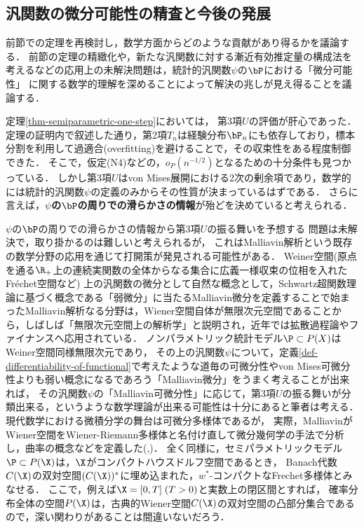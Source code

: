 \documentclass[uplatex, dvipdfmx]{jsarticle}
\begin{document}
\subsection{汎関数の微分可能性の精査と今後の発展}\label{subsection-Malliavin}

\begin{tcolorbox}[colframe=ForestGreen, colback=ForestGreen!10!white,breakable,colbacktitle=ForestGreen!40!white,coltitle=black,fonttitle=\bfseries\sffamily,
title=]
    前節での定理を再検討し，数学方面からどのような貢献があり得るかを議論する．
    前節の定理の精緻化や，新たな汎関数に対する漸近有効推定量の構成法を考えるなどの応用上の未解決問題は，統計的汎関数$\psi$の$\bP$における「微分可能性」
    に関する数学的理解を深めることによって解決の兆しが見え得ることを議論する．
\end{tcolorbox}

定理\ref{thm-semiparametric-one-step}においては，
第3項$U$の評価が肝心であった．
定理の証明内で叙述した通り，第2項$T_n$は経験分布$\bP_n$にも依存しており，標本分割を利用して過適合(overfitting)を避けることで，その収束性をある程度制御できた．
そこで，仮定(N4)などの，$o_P(n^{-1/2})$となるための十分条件も見つかっている\cite{Kennedy et al}．
しかし第3項$U$はvon Mises展開における2次の剰余項であり，数学的には統計的汎関数$\psi$の定義のみからその性質が決まっているはずである．
さらに言えば，\textbf{$\psi$の$\bP$の周りでの滑らかさの情報}が殆どを決めていると考えられる．

$\psi$の$\bP$の周りでの滑らかさの情報から第3項$U$の振る舞いを予想する
問題は未解決で，取り掛かるのは難しいと考えられるが，
これはMalliavin解析という既存の数学分野の応用を通じて打開策が発見される可能性がある．
Weiner空間(原点を通る$\R_+$上の連続実関数の全体からなる集合に広義一様収束の位相を入れたFréchet空間など)
上の汎関数の微分として自然な概念として，Schwartz超関数理論に基づく概念である「弱微分」に当たるMalliavin微分を定義することで始まったMalliavin解析なる分野は，Wiener空間自体が無限次元空間であることから，しばしば「無限次元空間上の解析学」と説明され，近年では拡散過程論やファイナンスへ応用されている\cite{Shinzo Watanabe}．
ノンパラメトリック統計モデル$\P\subset P(X)$はWeiner空間同様無限次元であり，
その上の汎関数$\psi$について，定義\ref{def-differentiability-of-functional}で考えたような道毎の可微分性やvon Mises可微分性よりも弱い概念になるであろう「Malliavin微分」をうまく考えることが出来れば，
その汎関数$\psi$の「Malliavin可微分性」に応じて，第3項$U$の振る舞いが分類出来る，というような数学理論が出来る可能性は十分にあると筆者は考える．
現代数学における微積分学の舞台は可微分多様体であるが，
実際，MalliavinがWiener空間をWiener-Riemann多様体と名付け直して微分幾何学の手法で分析し，曲率の概念などを定義した(\cite{Malliavin76},\cite{Malliavin})．
全く同様に，セミパラメトリックモデル$\P\subset P(\X)$は，$\X$がコンパクトハウスドルフ空間であるとき，
Banach代数$C(\X)$の双対空間$(C(\X))^*$に埋め込まれた，$w^*$-コンパクトなFrechet多様体とみなせる\cite{Pedersen}．
ここで，例えば$\X=[0,T]\;(T>0)$と実数上の閉区間とすれば，
確率分布全体の空間$P(\X)$は，古典的Wiener空間$C(\X)$の双対空間の凸部分集合であるので，深い関わりがあることは間違いないだろう．
\end{document}
